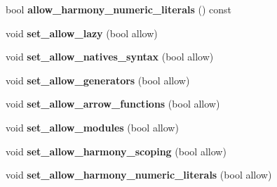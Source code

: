 \begin{DoxyCompactItemize}
\item 
\hypertarget{classv8_1_1internal_1_1_parser_base_a2b1d6ca4c191cf2fe7d6d0ee7c39798f}{}bool {\bfseries allow\+\_\+harmony\+\_\+numeric\+\_\+literals} () const \label{classv8_1_1internal_1_1_parser_base_a2b1d6ca4c191cf2fe7d6d0ee7c39798f}

\item 
\hypertarget{classv8_1_1internal_1_1_parser_base_a4dadc16b0fc8fcb300a3178b3c31efc9}{}void {\bfseries set\+\_\+allow\+\_\+lazy} (bool allow)\label{classv8_1_1internal_1_1_parser_base_a4dadc16b0fc8fcb300a3178b3c31efc9}

\item 
\hypertarget{classv8_1_1internal_1_1_parser_base_ad9803d619ae5f4443fa4a48f03f2b100}{}void {\bfseries set\+\_\+allow\+\_\+natives\+\_\+syntax} (bool allow)\label{classv8_1_1internal_1_1_parser_base_ad9803d619ae5f4443fa4a48f03f2b100}

\item 
\hypertarget{classv8_1_1internal_1_1_parser_base_a84234c3c279228388da47997a6c774ef}{}void {\bfseries set\+\_\+allow\+\_\+generators} (bool allow)\label{classv8_1_1internal_1_1_parser_base_a84234c3c279228388da47997a6c774ef}

\item 
\hypertarget{classv8_1_1internal_1_1_parser_base_a6227fd202c65254b2cbaf1037af05584}{}void {\bfseries set\+\_\+allow\+\_\+arrow\+\_\+functions} (bool allow)\label{classv8_1_1internal_1_1_parser_base_a6227fd202c65254b2cbaf1037af05584}

\item 
\hypertarget{classv8_1_1internal_1_1_parser_base_a95fbf3b9dd7f87adec575f0de0730281}{}void {\bfseries set\+\_\+allow\+\_\+modules} (bool allow)\label{classv8_1_1internal_1_1_parser_base_a95fbf3b9dd7f87adec575f0de0730281}

\item 
\hypertarget{classv8_1_1internal_1_1_parser_base_a423e127176278389dd3184916c8fc7e2}{}void {\bfseries set\+\_\+allow\+\_\+harmony\+\_\+scoping} (bool allow)\label{classv8_1_1internal_1_1_parser_base_a423e127176278389dd3184916c8fc7e2}

\item 
\hypertarget{classv8_1_1internal_1_1_parser_base_aa1282dc8de767b3a66af3efd2566a125}{}void {\bfseries set\+\_\+allow\+\_\+harmony\+\_\+numeric\+\_\+literals} (bool allow)\label{classv8_1_1internal_1_1_parser_base_aa1282dc8de767b3a66af3efd2566a125}

\end{DoxyCompactItemize}
